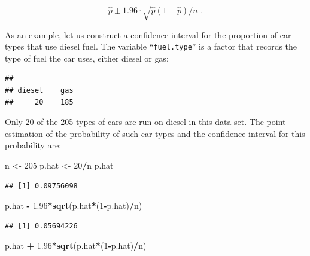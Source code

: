 \documentclass[
]{krantz}
\makeatletter
\newenvironment{Shaded}{\begin{snugshade}}{\end{snugshade}}
\newcommand{\DecValTok}[1]{\textcolor[rgb]{0.00,0.00,0.81}{#1}}
\newcommand{\FloatTok}[1]{\textcolor[rgb]{0.00,0.00,0.81}{#1}}
\newcommand{\KeywordTok}[1]{\textcolor[rgb]{0.13,0.29,0.53}{\textbf{#1}}}
\newcommand{\NormalTok}[1]{#1}
\newcommand{\OperatorTok}[1]{\textcolor[rgb]{0.81,0.36,0.00}{\textbf{#1}}}
\newcommand{\StringTok}[1]{\textcolor[rgb]{0.31,0.60,0.02}{#1}}
\newenvironment{kframe}{%
\medskip{}
\setlength{\fboxsep}{.8em}
 \def\at@end@of@kframe{}%
 \ifinner\ifhmode%
  \def\at@end@of@kframe{\end{minipage}}%
  \begin{minipage}{\columnwidth}%
 \fi\fi%
 \def\FrameCommand##1{\hskip\@totalleftmargin \hskip-\fboxsep
 \colorbox{shadecolor}{##1}\hskip-\fboxsep
     \hskip-\linewidth \hskip-\@totalleftmargin \hskip\columnwidth}%
 \MakeFramed {\advance\hsize-\width
   \@totalleftmargin\z@ \linewidth\hsize
   \@setminipage}}%
 {\par\unskip\endMakeFramed%
 \at@end@of@kframe}
\renewenvironment{Shaded}{\begin{kframe}}{\end{kframe}}
\theoremstyle{definition}
\theoremstyle{definition}
\theoremstyle{definition}
\theoremstyle{remark}
\makeatother
\begin{document}
\[\hat p \pm 1.96 \cdot \sqrt{\hat p (1-\hat p)/n}\;.\]

As an example, let us construct a confidence interval for the proportion
of car types that use diesel fuel. The variable ``\texttt{fuel.type}'' is a
factor that records the type of fuel the car uses, either diesel or gas:

\begin{Shaded}
\end{Shaded}

\begin{verbatim}
## 
## diesel    gas 
##     20    185
\end{verbatim}

Only 20 of the 205 types of cars are run on diesel in this data set. The
point estimation of the probability of such car types and the confidence
interval for this probability are:

\begin{Shaded}
\begin{Highlighting}[]
\NormalTok{n <-}\StringTok{ }\DecValTok{205}
\NormalTok{p.hat <-}\StringTok{ }\DecValTok{20}\OperatorTok{/}\NormalTok{n}
\NormalTok{p.hat}
\end{Highlighting}
\end{Shaded}

\begin{verbatim}
## [1] 0.09756098
\end{verbatim}

\begin{Shaded}
\begin{Highlighting}[]
\NormalTok{p.hat }\OperatorTok{-}\StringTok{ }\FloatTok{1.96}\OperatorTok{*}\KeywordTok{sqrt}\NormalTok{(p.hat}\OperatorTok{*}\NormalTok{(}\DecValTok{1}\OperatorTok{-}\NormalTok{p.hat)}\OperatorTok{/}\NormalTok{n)}
\end{Highlighting}
\end{Shaded}

\begin{verbatim}
## [1] 0.05694226
\end{verbatim}

\begin{Shaded}
\begin{Highlighting}[]
\NormalTok{p.hat }\OperatorTok{+}\StringTok{ }\FloatTok{1.96}\OperatorTok{*}\KeywordTok{sqrt}\NormalTok{(p.hat}\OperatorTok{*}\NormalTok{(}\DecValTok{1}\OperatorTok{-}\NormalTok{p.hat)}\OperatorTok{/}\NormalTok{n)}
\end{Highlighting}
\end{Shaded}
\end{document}
